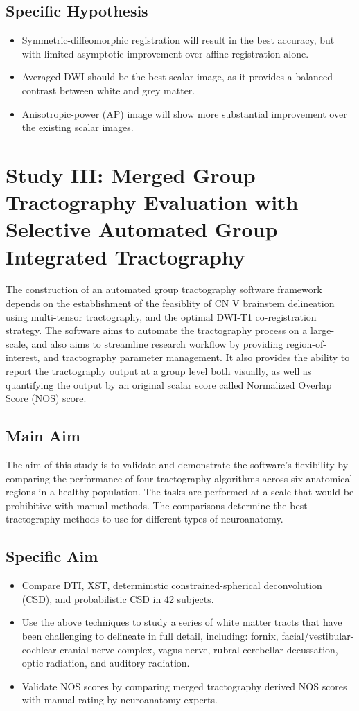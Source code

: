 \subsection{Specific Hypothesis}
\begin{itemize}
    \item Symmetric-diffeomorphic registration will result in the best accuracy, but with limited asymptotic improvement over affine registration alone.
    \item Averaged DWI should be the best scalar image, as it provides a balanced contrast between white and grey matter.
    \item Anisotropic-power (AP) image will show more substantial improvement over the existing scalar images.
\end{itemize}

\section{Study III: Merged Group Tractography Evaluation with Selective Automated Group Integrated Tractography}
The construction of an automated group tractography software framework depends on the establishment of the feasiblity of CN V brainstem delineation using multi-tensor tractography, and the optimal DWI-T1 co-registration strategy. The software aims to automate the tractography process on a large-scale, and also aims to streamline research workflow by providing region-of-interest, and tractography parameter management. It also provides the ability to report the tractography output at a group level both visually, as well as quantifying the output by an original scalar score called Normalized Overlap Score (NOS) score. 

\subsection{Main Aim}
The aim of this study is to validate and demonstrate the software's flexibility by comparing the performance of four tractography algorithms across six anatomical regions in a healthy population. The tasks are performed  at a scale that would be prohibitive with manual methods. The comparisons determine the best tractography methods to use for different types of neuroanatomy.

\subsection{Specific Aim}
\begin{itemize}
    \item Compare DTI, XST, deterministic constrained-spherical deconvolution (CSD), and probabilistic CSD in 42 subjects. 
    \item Use the above techniques to study a series of white matter tracts that have been challenging to delineate in full detail, including: fornix, facial/vestibular-cochlear cranial nerve complex, vagus nerve, rubral-cerebellar decussation, optic radiation, and auditory radiation.
    \item Validate NOS scores by comparing merged tractography derived NOS scores with manual rating by neuroanatomy experts.
\end{itemize}

